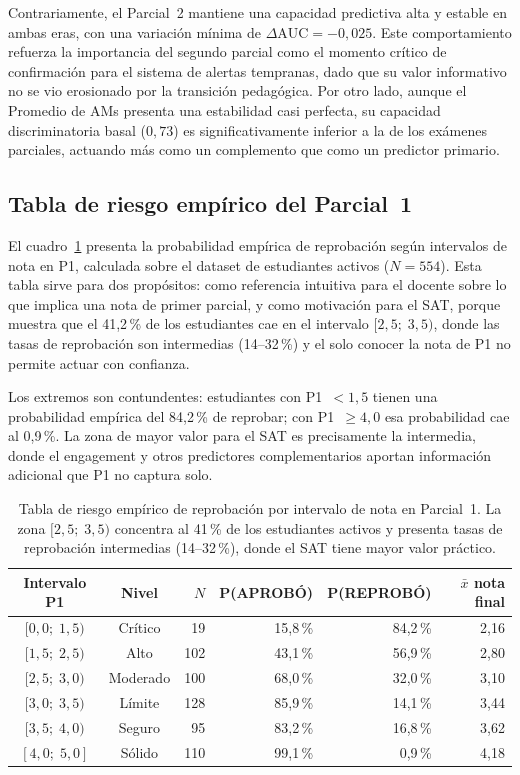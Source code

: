 \documentclass[12pt, letterpaper, openany]{report}
\begin{document}
Contrariamente, el Parcial~2 mantiene una capacidad predictiva alta y estable en ambas eras, con una variación mínima de $\Delta\text{AUC} = -0{,}025$. Este comportamiento refuerza la importancia del segundo parcial como el momento crítico de confirmación para el sistema de alertas tempranas, dado que su valor informativo no se vio erosionado por la transición pedagógica. Por otro lado, aunque el Promedio de AMs presenta una estabilidad casi perfecta, su capacidad discriminatoria basal ($0{,}73$) es significativamente inferior a la de los exámenes parciales, actuando más como un complemento que como un predictor primario.

\FloatBarrier

\subsection{Tabla de riesgo empírico del Parcial~1}
\label{sssec:riesgo_p1}

El cuadro~\ref{tab:riesgo_p1} presenta la probabilidad empírica de reprobación según intervalos de nota en P1, calculada sobre el dataset de estudiantes activos ($N = 554$). Esta tabla sirve para dos propósitos: como referencia intuitiva para el docente sobre lo que implica una nota de primer parcial, y como motivación para el SAT, porque muestra que el 41,2\,\% de los estudiantes cae en el intervalo $[2{,}5;\;3{,}5)$, donde las tasas de reprobación son intermedias (14--32\,\%) y el solo conocer la nota de P1 no permite actuar con confianza.

Los extremos son contundentes: estudiantes con P1~$< 1{,}5$ tienen una probabilidad empírica del 84,2\,\% de reprobar; con P1~$\geq 4{,}0$ esa probabilidad cae al 0,9\,\%. La zona de mayor valor para el SAT es precisamente la intermedia, donde el engagement y otros predictores complementarios aportan información adicional que P1 no captura solo.

\begin{table}[htbp]
  \centering
  \caption{Tabla de riesgo empírico de reprobación por intervalo de nota en Parcial~1. La zona $[2{,}5;\;3{,}5)$ concentra al 41\,\% de los estudiantes activos y presenta tasas de reprobación intermedias (14--32\,\%), donde el SAT tiene mayor valor práctico.}
  \label{tab:riesgo_p1}
  \begin{tabular}{ccrrrr}
    \toprule
    Intervalo P1 & Nivel & $N$ & P(APROBÓ) & P(REPROBÓ) & $\bar{x}$ nota final \\
    \midrule
    $[0{,}0;\;1{,}5)$  & Crítico  &  19 & 15,8\,\% & 84,2\,\% & 2,16 \\
    $[1{,}5;\;2{,}5)$  & Alto     & 102 & 43,1\,\% & 56,9\,\% & 2,80 \\
    $[2{,}5;\;3{,}0)$  & Moderado & 100 & 68,0\,\% & 32,0\,\% & 3,10 \\
    $[3{,}0;\;3{,}5)$  & Límite   & 128 & 85,9\,\% & 14,1\,\% & 3,44 \\
    $[3{,}5;\;4{,}0)$  & Seguro   &  95 & 83,2\,\% & 16,8\,\% & 3,62 \\
    $[4{,}0;\;5{,}0]$  & Sólido   & 110 & 99,1\,\% &  0,9\,\% & 4,18 \\
    \bottomrule
  \end{tabular}
\end{table}
\end{document}
